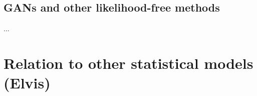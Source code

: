 \documentclass[10pt,letterpaper]{article}
\DeclareMathOperator{\argmax}{argmax}
\begin{document}





\subsection{GANs and other likelihood-free methods}
...

\section{Relation to other statistical models (Elvis)}
\end{document}
